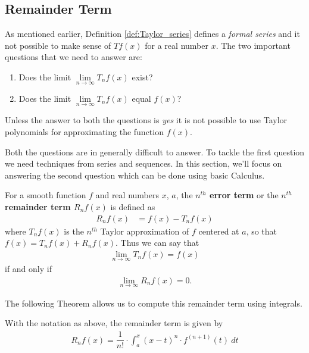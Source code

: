 \subsection{Remainder Term}
As mentioned earlier, Definition \ref{def:Taylor_series} defines a \textit{formal series} and it not possible to make sense of $Tf(x)$ for a real number $x$.
The two important questions that we need to answer are:
\begin{enumerate}
  \item  Does the limit $\lim \limits_{n \rightarrow \infty}T_n f(x)$ exist?
  \item Does the limit $\lim \limits_{n \rightarrow \infty}T_n f(x)$ equal $f(x)$?
\end{enumerate}
Unless the answer to both the questions is {\it yes} it is not possible to use Taylor polynomials for approximating the function $f(x)$.

Both the questions are in generally difficult to answer.
To tackle the first question we need techniques from series and sequences.
In this section, we'll focus on answering the second question which can be done using basic Calculus.


\begin{definition}
  For a smooth function $f$ and real numbers $x$, $a$, the {\bf $n^{th}$ error term} or the {\bf $n^{th}$ remainder term $R_nf(x)$} is defined as
  \begin{align*}
    R_nf(x)
    &= f(x) - T_nf(x)
  \end{align*}
  where $T_n f(x)$ is the $n^{th}$ Taylor approximation of $f$ centered at $a$, so that $f(x) = T_nf(x) + R_nf(x)$.
Thus we can say that
\begin{align*}
  \lim \limits_{n \rightarrow \infty}T_n f(x) = f(x)
\end{align*}
if and only if
\begin{align*}
  \lim \limits_{n \rightarrow \infty}R_n f(x) = 0.
\end{align*}
\end{definition}

\newpage

The following Theorem allows us to compute this remainder term using integrals.
\begin{theorem}
  \label{thm:remainder_term}
  With the notation as above, the remainder term is given by
  \begin{align*}
    R_nf(x) = \dfrac{1}{n!} \cdot \int_a^x {(x-t)^n \cdot {f^{(n+1)}(t)} } \: dt
  \end{align*}
\end{theorem}


